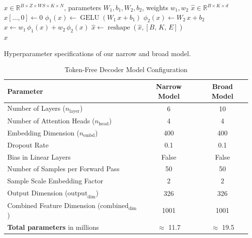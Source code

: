 \documentclass{article}
\begin{document}
\begin{algorithm}
\caption{ProjectionReplacingEmbeddingTable}\label{alg:projEmbed}
\begin{algorithmic}[1]
\Require $x \in \mathbb{R}^{B \times Z \times  WS \times K \times N}$, parameters $W_1, b_1, W_2, b_2$, weights $w_1, w_2$
\Ensure $\hat{x} \in \mathbb{R}^{B \times K \times d}$
\State $x[...,0] \gets 0$
\State $\phi_1(x) \gets \operatorname{GELU}(W_1\,x + b_1)$
\State $\phi_2(x) \gets W_2\,x + b_2$
\State $\hat{x} \gets w_1\,\phi_1(x) + w_2\,\phi_2(x)$ 
\State $\hat{x} \gets \operatorname{reshape}(\hat{x}, [B,\,K,\,E])$ \\
\Return $\hat{x}$
\end{algorithmic}
\end{algorithm}


Hyperparameter specifications of our narrow and broad model.

\begin{table}[ht]
    \centering
    \caption{Token-Free Decoder Model Configuration}
    \label{tab:model-config}
    \begin{tabular}{lcc}
        \toprule
        \textbf{Parameter} & \textbf{Narrow Model} & \textbf{Broad Model} \\
        \midrule
        Number of Layers ($n_{\text{layer}}$)              & 6 & 10 \\
        Number of Attention Heads ($n_{\text{head}}$)       & 4 & 4 \\
        Embedding Dimension ($n_{\text{embd}}$)             & 400 & 400 \\
        Dropout Rate                                        & 0.1 & 0.1 \\
        Bias in Linear Layers                               & False & False \\
        Number of Samples per Forward Pass                & 50 & 50 \\
        Sample Scale Embedding Factor                       & 2 & 2 \\
        Output Dimension ($\text{output}_{\text{dim}}$)     & 326 & 326 \\
        Combined Feature Dimension (${\text{combined}}_{\text{dim}}$) & 1001 & 1001 \\
        \textbf{Total parameters} in millions & $\approx$ 11.7 & $\approx$ 19.5 \\
        \bottomrule
    \end{tabular}
\end{table}
\end{document}
